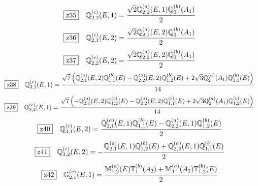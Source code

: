 \documentclass[fleqn,10pt,landscape]{jsarticle}
\begin{document}
\begin{dmath*}
\hspace*{3mm}\fbox{z35}\quad \mathbb{Q}_{2,2}^{(c)}(E,1)=\frac{\sqrt{2} \mathbb{Q}_{2,2}^{(a)}(E,1) \mathbb{Q}_{0}^{(b)}(A_{1})}{2}
\end{dmath*}
\begin{dmath*}
\hspace*{3mm}\fbox{z36}\quad \mathbb{Q}_{2,1}^{(c)}(E,2)=\frac{\sqrt{2} \mathbb{Q}_{2,1}^{(a)}(E,2) \mathbb{Q}_{0}^{(b)}(A_{1})}{2}
\end{dmath*}
\begin{dmath*}
\hspace*{3mm}\fbox{z37}\quad \mathbb{Q}_{2,2}^{(c)}(E,2)=\frac{\sqrt{2} \mathbb{Q}_{2,2}^{(a)}(E,2) \mathbb{Q}_{0}^{(b)}(A_{1})}{2}
\end{dmath*}
\begin{dmath*}
\hspace*{3mm}\fbox{z38}\quad \mathbb{Q}_{3,1}^{(c)}(E,1)=\frac{\sqrt{7} \left(\mathbb{Q}_{2,1}^{(a)}(E,2) \mathbb{Q}_{1,1}^{(b)}(E) - \mathbb{Q}_{2,2}^{(a)}(E,2) \mathbb{Q}_{1,2}^{(b)}(E) + 2 \sqrt{3} \mathbb{Q}_{2}^{(a)}(A_{1}) \mathbb{Q}_{1,1}^{(b)}(E)\right)}{14}
\end{dmath*}
\begin{dmath*}
\hspace*{3mm}\fbox{z39}\quad \mathbb{Q}_{3,2}^{(c)}(E,1)=\frac{\sqrt{7} \left(- \mathbb{Q}_{2,1}^{(a)}(E,2) \mathbb{Q}_{1,2}^{(b)}(E) - \mathbb{Q}_{2,2}^{(a)}(E,2) \mathbb{Q}_{1,1}^{(b)}(E) + 2 \sqrt{3} \mathbb{Q}_{2}^{(a)}(A_{1}) \mathbb{Q}_{1,2}^{(b)}(E)\right)}{14}
\end{dmath*}
\begin{dmath*}
\hspace*{3mm}\fbox{z40}\quad \mathbb{Q}_{3,1}^{(c)}(E,2)=\frac{\mathbb{Q}_{2,1}^{(a)}(E,1) \mathbb{Q}_{1,1}^{(b)}(E) - \mathbb{Q}_{2,2}^{(a)}(E,1) \mathbb{Q}_{1,2}^{(b)}(E)}{2}
\end{dmath*}
\begin{dmath*}
\hspace*{3mm}\fbox{z41}\quad \mathbb{Q}_{3,2}^{(c)}(E,2)=- \frac{\mathbb{Q}_{2,1}^{(a)}(E,1) \mathbb{Q}_{1,2}^{(b)}(E) + \mathbb{Q}_{2,2}^{(a)}(E,1) \mathbb{Q}_{1,1}^{(b)}(E)}{2}
\end{dmath*}
\begin{dmath*}
\hspace*{3mm}\fbox{z42}\quad \mathbb{G}_{2,1}^{(c)}(E,1)=\frac{\mathbb{M}_{1,2}^{(a)}(E) \mathbb{T}_{1}^{(b)}(A_{2}) + \mathbb{M}_{1}^{(a)}(A_{2}) \mathbb{T}_{1,2}^{(b)}(E)}{2}
\end{dmath*}
\end{document}
